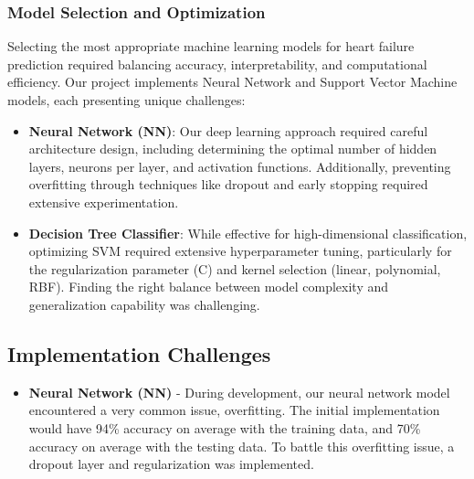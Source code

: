\documentclass[11pt,a4paper]{article}
\newcommand{\greencheck}{\textcolor{green}{\ding{52}}}
\begin{document}
\subsubsection{Model Selection and Optimization}
\vspace{-0.25cm}
Selecting the most appropriate machine learning models for heart failure prediction required balancing accuracy, interpretability, and computational efficiency. Our project implements Neural Network and Support Vector Machine models, each presenting unique challenges:

\begin{itemize}
    \vspace{-0.25cm}
    \item \textbf{\greencheck \space Neural Network (NN)}: Our deep learning approach required careful architecture design, including determining the optimal number of hidden layers, neurons per layer, and activation functions. Additionally, preventing overfitting through techniques like dropout and early stopping required extensive experimentation.

    \item \textbf{\greencheck \space Decision Tree Classifier}: While effective for high-dimensional classification, optimizing SVM required extensive hyperparameter tuning, particularly for the regularization parameter (C) and kernel selection (linear, polynomial, RBF). Finding the right balance between model complexity and generalization capability was challenging.
\end{itemize}

\subsection{Implementation Challenges}
\begin{itemize}
    \item \textbf{Neural Network (NN)} - During development, our neural network model encountered a very common issue, overfitting. The initial implementation would have 94\% accuracy on average with the training data, and 70\% accuracy on average with the testing data. To battle this overfitting issue, a dropout layer and regularization was implemented.
\end{itemize}

\end{document}
